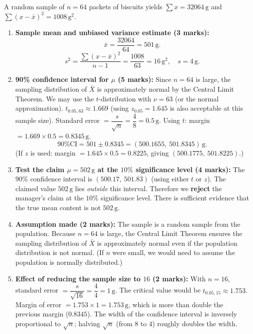 \documentclass[11pt]{article}
\begin{document}
\begin{corrige}
A random sample of \(n=64\) packets of biscuits yields \(\sum x = 32064\,\mathrm{g}\) and \(\sum(x-\bar{x})^2 = 1008\,\mathrm{g}^2\).

\begin{enumerate}
\item \textbf{Sample mean and unbiased variance estimate (3 marks):}
\[
\bar{x} = \frac{32064}{64} = 501\,\mathrm{g}.
\]
\[
s^2 = \frac{\sum(x-\bar{x})^2}{n-1} = \frac{1008}{63} = 16\,\mathrm{g}^2,\quad s = 4\,\mathrm{g}.
\]

\item \textbf{90\% confidence interval for \(\mu\) (5 marks):}
Since \(n=64\) is large, the sampling distribution of \(\bar{X}\) is approximately normal by the Central Limit Theorem. We may use the \(t\)-distribution with \(\nu=63\) (or the normal approximation).
\(t_{0.05,63} \approx 1.669\) (using \(z_{0.05}=1.645\) is also acceptable at this sample size).
Standard error \(= \dfrac{s}{\sqrt{n}} = \dfrac{4}{8} = 0.5\,\mathrm{g}\).
Using \(t\): margin \(= 1.669 \times 0.5 = 0.8345\,\mathrm{g}\).
\[
\text{90\% CI} = 501 \pm 0.8345 = (500.1655,\ 501.8345)\,\mathrm{g}.
\]
(If \(z\) is used: margin \(= 1.645 \times 0.5 = 0.8225\), giving \((500.1775,\ 501.8225)\).)

\item \textbf{Test the claim \(\mu = 502\,\mathrm{g}\) at the \(10\%\) significance level (4 marks):}
The \(90\%\) confidence interval is \((500.17,\ 501.83)\) (using either \(t\) or \(z\)). The claimed value \(502\,\mathrm{g}\) lies \emph{outside} this interval. Therefore we \textbf{reject} the manager's claim at the \(10\%\) significance level. There is sufficient evidence that the true mean content is not \(502\,\mathrm{g}\).

\item \textbf{Assumption made (2 marks):}
The sample is a random sample from the population. Because \(n=64\) is large, the Central Limit Theorem ensures the sampling distribution of \(\bar{X}\) is approximately normal even if the population distribution is not normal. (If \(n\) were small, we would need to assume the population is normally distributed.)

\item \textbf{Effect of reducing the sample size to \(16\) (2 marks):}
With \(n=16\), standard error \(= \dfrac{s}{\sqrt{16}} = \dfrac{4}{4} = 1\,\mathrm{g}\).
The critical value would be \(t_{0.05,15} \approx 1.753\).
Margin of error \(= 1.753 \times 1 = 1.753\,\mathrm{g}\), which is more than double the previous margin (\(0.8345\)).
The width of the confidence interval is inversely proportional to \(\sqrt{n}\); halving \(\sqrt{n}\) (from \(8\) to \(4\)) roughly doubles the width.
\end{enumerate}
\end{corrige}
\end{document}
